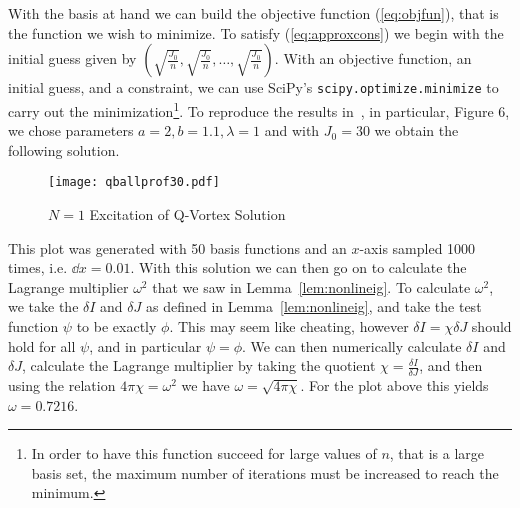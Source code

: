 With the basis at hand we can build the objective function (\ref{eq:objfun}),
that is the function we wish to minimize. To satisfy (\ref{eq:approxcons}) we
begin with the initial guess given by \(\left(\sqrt{\frac{J_0}{n}}, \sqrt{\frac{J_0}{n}}, \ldots, \sqrt{\frac{J_0}{n}}\right)\).
With an objective function, an initial guess, and a constraint, we can use
SciPy's \texttt{scipy.optimize.minimize} to carry out the
minimization\footnote{In order to have this function succeed for large values of
    \(n\), that is a large basis set, the maximum number of iterations must be
    increased to reach the minimum.}. To reproduce the results in~\cite{spinningq},
in particular, Figure 6, we chose parameters \(a = 2, b = 1.1, \lambda = 1\) and
with \(J_0 = 30\) we obtain the following solution.
\begin{figure}[H]
    \centering
    \texttt{[image: qballprof30.pdf]}
    \caption{\(N = 1\) Excitation of Q-Vortex Solution}\label{fig:profile30}
\end{figure}
This plot was generated with 50 basis functions and an \(x\)-axis sampled 1000
times, i.e. \(\dd{x} = 0.01\). With this solution we can then go on to calculate
the Lagrange multiplier \(\omega^2\) that we saw in Lemma~\ref{lem:nonlineig}.
To calculate \(\omega^2\), we take the \(\delta I\) and \(\delta J\) as defined
in Lemma~\ref{lem:nonlineig}, and take the test function \(\psi\) to be exactly
\(\phi\). This may seem like cheating, however \(\delta I = \chi\delta J\)
should hold for all \(\psi\), and in particular \(\psi = \phi\). We can then
numerically calculate \(\delta I\) and \(\delta J\), calculate the Lagrange
multiplier by taking the quotient \(\chi = \frac{\delta I}{\delta J}\), and then
using the relation \(4\pi\chi = \omega^2\) we have \(\omega = \sqrt{4\pi\chi}\).
For the plot above this yields \(\omega = 0.7216\).

